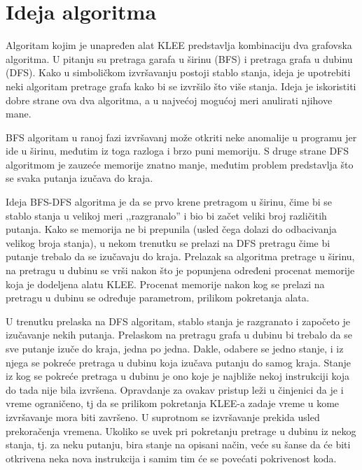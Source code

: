 \documentclass[12pt,oneside]{memoir}
\begin{document}
\section{Ideja algoritma}
Algoritam kojim je unapređen alat KLEE predstavlja kombinaciju dva grafovska algoritma. U pitanju su pretraga garafa u širinu (BFS) i pretraga grafa u dubinu (DFS). Kako u simboličkom izvršavanju postoji stablo stanja, ideja je upotrebiti neki algoritam pretrage grafa kako bi se izvršilo što više stanja. Ideja je iskoristiti dobre strane ova dva algoritma, a u najvećoj mogućoj meri anulirati njihove mane. 

BFS algoritam u ranoj fazi izvršavanj može otkriti neke anomalije u programu jer ide u širinu, međutim iz toga razloga i brzo puni memoriju. S druge strane DFS algoritmom je zauzeće memorije znatno manje, međutim problem predstavlja što se svaka putanja izučava do kraja. 

Ideja BFS-DFS algoritma je da se prvo krene pretragom u širinu, čime bi se stablo stanja u velikoj meri ,,razgranalo'' i bio bi začet veliki broj različitih putanja. Kako se memorija ne bi prepunila (usled čega dolazi do odbacivanja velikog broja stanja), u nekom trenutku se prelazi na DFS pretragu čime bi putanje trebalo da se izučavaju do kraja. Prelazak sa algoritma pretrage u širinu, na pretragu u dubinu se vrši nakon što je popunjena određeni procenat memorije koja je dodeljena alatu KLEE. Procenat memorije nakon kog se prelazi na pretragu u dubinu se određuje parametrom, prilikom pokretanja alata. 

U trenutku prelaska na DFS algoritam, stablo stanja je razgranato i započeto je izučavanje nekih putanja. Prelaskom na pretragu grafa u dubinu bi trebalo da se sve putanje izuče do kraja, jedna po jedna. Dakle, odabere se jedno stanje, i iz njega se pokreće pretraga u dubinu koja izučava putanju do samog kraja. Stanje iz kog se pokreće pretraga u dubinu je ono koje je najbliže nekoj instrukciji koja do tada nije bila izvršena. Opravdanje za ovakav pristup leži u činjenici da je i vreme ograničeno, tj da se prilikom pokretanja KLEE-a zadaje vreme u kome izvršavanje mora biti završeno. U suprotnom se izvršavanje prekida usled prekoračenja vremena. Ukoliko se uvek pri pokretanju pretrage u dubinu iz nekog stanja, tj. za neku putanju, bira stanje na opisani način, veće su šanse da će biti otkrivena neka nova instrukcija i samim tim će se povećati pokrivenost koda. 
\end{document}
